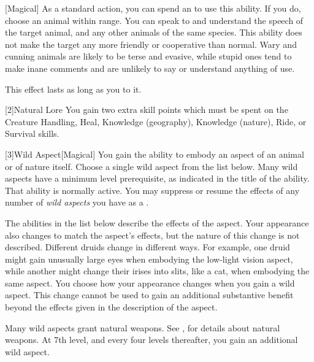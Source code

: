         [Magical] As a standard action, you can spend an  to use this ability.
        If you do, choose an animal within \rnglong range.
        You can speak to and understand the speech of the target animal, and any other animals of the same species.
        This ability does not make the target any more friendly or cooperative than normal.
        Wary and cunning animals are likely to be terse and evasive, while stupid ones tend to make inane comments and are unlikely to say or understand anything of use.

        This effect lasts as long as you  to it.

        [2]{Natural Lore}
        You gain two extra skill points which must be spent on the Creature Handling, Heal, Knowledge (geography), Knowledge (nature), Ride, or Survival skills.

        [3]{Wild Aspect}[Magical]
        You gain the ability to embody an aspect of an animal or of nature itself.
        Choose a single wild aspect from the list below.
        Many wild aspects have a minimum level prerequisite, as indicated in the title of the ability.
        That ability is normally active.
        You may suppress or resume the effects of any number of \textit{wild aspects} you have as a .

        The abilities in the list below describe the effects of the aspect.
        Your appearance also changes to match the aspect's effects, but the nature of this change is not described.
        Different druids change in different ways.
        For example, one druid might gain unusually large eyes when embodying the low-light vision aspect, while another might change their irises into slits, like a cat, when embodying the same aspect.
        You choose how your appearance changes when you gain a wild aspect.
        This change cannot be used to gain an additional substantive benefit beyond the effects given in the description of the aspect.

        Many wild aspects grant natural weapons.
        See , for details about natural weapons.
        At 7th level, and every four levels thereafter, you gain an additional wild aspect.

